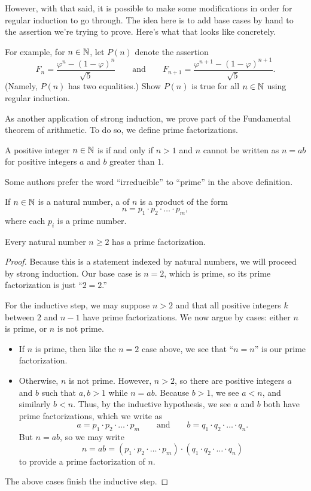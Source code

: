 \documentclass[../main.tex]{subfiles}
\begin{document}
However, with that said, it is possible to make some modifications in order for regular induction to go through. The idea here is to add base cases by hand to the assertion we're trying to prove. Here's what that looks like concretely.
\begin{exe} \label{exe:binet-regular-induction}
    For example, for $n\in\mathbb N$, let $P(n)$ denote the assertion
    \[F_n=\frac{\varphi^n-(1-\varphi)^n}{\sqrt5}\qquad\text{and}\qquad F_{n+1}=\frac{\varphi^{n+1}-(1-\varphi)^{n+1}}{\sqrt5}.\]
    (Namely, $P(n)$ has two equalities.) Show $P(n)$ is true for all $n\in\mathbb N$ using regular induction.
\end{exe}
As another application of strong induction, we prove part of the Fundamental theorem of arithmetic. To do so, we define prime factorizations.
\begin{definition}[prime] 
    A positive integer $n\in\mathbb N$ is  if and only if $n>1$ and $n$ cannot be written as $n=ab$ for positive integers $a$ and $b$ greater than $1$.
\end{definition}
\begin{remark}
    Some authors prefer the word ``irreducible'' to ``prime'' in the above definition.
\end{remark}
\begin{definition}
    If $n \in \mathbb N$ is a natural number, a  of $n$ is a product of the form
    \[n = p_1\cdot p_2\cdot\ldots\cdot p_m,\]
    where each $p_i$ is a prime number.
\end{definition}
\begin{theorem}  \label{thm:fta}
    Every natural number $n \geq 2$ has a prime factorization.
\end{theorem}
\begin{proof}
    Because this is a statement indexed by natural numbers, we will proceed by strong induction. Our base case is $n=2$, which is prime, so its prime factorization is just ``$2=2$.''

    For the inductive step, we may suppose $n>2$ and that all positive integers $k$ between $2$ and $n-1$ have prime factorizations. We now argue by cases: either $n$ is prime, or $n$ is not prime.
    \begin{itemize}
        \item If $n$ is prime, then like the $n=2$ case above, we see that ``$n=n$'' is our prime factorization.
        \item Otherwise, $n$ is not prime. However, $n>2$, so there are positive integers $a$ and $b$ such that $a,b>1$ while $n = ab$. Because $b>1$, we see $a<n$, and similarly $b<n$. Thus, by the inductive hypothesis, we see $a$ and $b$ both have prime factorizations, which we write as
        \[a=p_1\cdot p_2\cdot\ldots\cdot p_m\qquad\text{and}\qquad b=q_1\cdot q_2\cdot\ldots\cdot q_n.\]
        But $n=ab$, so we may write
        \[n=ab=(p_1\cdot p_2\cdot\ldots\cdot p_m)\cdot(q_1\cdot q_2\cdot\ldots\cdot q_n)\]
        to provide a prime factorization of $n$.
    \end{itemize}
    The above cases finish the inductive step.
\end{proof}
\end{document}
